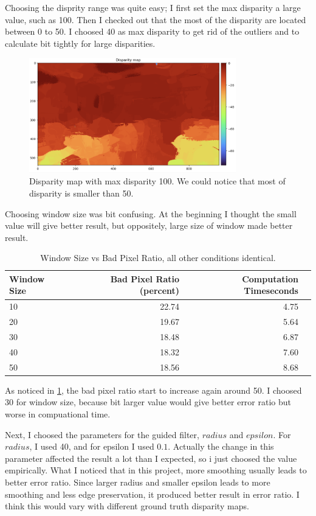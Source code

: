 Choosing the disprity range was quite easy; I first set the max disparity a large value, such as 100. Then I checked out that the most of the disparity are located between 0 to 50. I choosed 40 as max disparity to get rid of the outliers and to calculate bit tightly for large disparities.
\begin{figure}[h]
    \centering
    \includegraphics[width=9cm]{../result/disparityragne100.png}
    \caption{Disparity map with max disparity 100. We could notice that most of disparity is smaller than 50.}
    \label{fig:result3}
\end{figure}

Choosing window size was bit confusing. At the beginning I thought the small value will give better result, but oppositely, large size of window made better result. 


\begin{table}[h]
    \centering
    \begin{tabular}{lrrr}
        \toprule
        {Window Size}&{Bad Pixel Ratio (percent)}&{Computation Time{seconds}} \\
        \midrule
        10 & 22.74 & 4.75\\
        20 & 19.67 & 5.64\\
        30 & 18.48 & 6.87\\
        40 & 18.32 & 7.60\\
        50 & 18.56 & 8.68\\
        \bottomrule
    \end{tabular}
    \caption{Window Size vs Bad Pixel Ratio, all other conditions identical.}
    \label{tab:table1}
\end{table}

As noticed in \ref{tab:table1}, the bad pixel ratio start to increase again around 50. I choosed 30 for window size, because bit larger value would give better error ratio but worse in compuational time.

Next, I choosed the parameters for the guided filter, $radius$ and $epsilon$. For $radius$, I used 40, and for epsilon I used $0.1$. Actually the change in this parameter affected the result a lot than I expected, so i just choosed the value empirically. What I noticed that in this project, more smoothing usually leads to better error ratio. Since larger radius and smaller epsilon leads to more smoothing and less edge preservation, it produced better result in error ratio. I think this would vary with different ground truth disparity maps.

